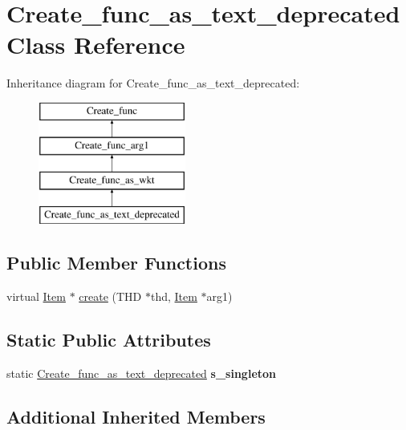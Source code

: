 \hypertarget{classCreate__func__as__text__deprecated}{}\section{Create\+\_\+func\+\_\+as\+\_\+text\+\_\+deprecated Class Reference}
\label{classCreate__func__as__text__deprecated}
Inheritance diagram for Create\+\_\+func\+\_\+as\+\_\+text\+\_\+deprecated\+:\begin{figure}[H]
\begin{center}
\leavevmode
\includegraphics[height=4.000000cm]{classCreate__func__as__text__deprecated}
\end{center}
\end{figure}
\subsection*{Public Member Functions}
\begin{DoxyCompactItemize}
\item 
virtual \mbox{\hyperlink{classItem}{Item}} $\ast$ \mbox{\hyperlink{classCreate__func__as__text__deprecated_a70b5c2ffaf2afdf07c1229039a546697}{create}} (T\+HD $\ast$thd, \mbox{\hyperlink{classItem}{Item}} $\ast$arg1)
\end{DoxyCompactItemize}
\subsection*{Static Public Attributes}
\begin{DoxyCompactItemize}
\item 
\mbox{\label{classCreate__func__as__text__deprecated_ab66509538db0402093b0bc1e12b82d89}} 
static \mbox{\hyperlink{classCreate__func__as__text__deprecated}{Create\+\_\+func\+\_\+as\+\_\+text\+\_\+deprecated}} {\bfseries s\+\_\+singleton}
\end{DoxyCompactItemize}
\subsection*{Additional Inherited Members}


